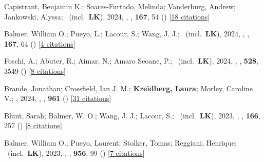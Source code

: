 \item[{\color{numcolor}\scriptsize102}] Capistrant, Benjamin K.; Soares-Furtado, Melinda; Vanderburg, Andrew; Jankowski, Alyssa; \etal\ (incl.\ \textbf{LK}), 2024, , \aj, \textbf{167}, 54 () [\href{https://ui.adsabs.harvard.edu/abs/2024AJ....167...54C}{18 citations}]

\item[{\color{numcolor}\scriptsize101}] Balmer, William O.; Pueyo, L.; Lacour, S.; Wang, J. J.; \etal\ (incl.\ \textbf{LK}), 2024, , \aj, \textbf{167}, 64 () [\href{https://ui.adsabs.harvard.edu/abs/2024AJ....167...64B}{4 citations}]

\item[{\color{numcolor}\scriptsize100}] Foschi, A.; Abuter, R.; Aimar, N.; Amaro Seoane, P.; \etal\ (incl.\ \textbf{LK}), 2024, , \mnras, \textbf{528}, 3549 () [\href{https://ui.adsabs.harvard.edu/abs/2024MNRAS.528.3549F}{8 citations}]

\item[{\color{numcolor}\scriptsize99}] Brande, Jonathan; Crossfield, Ian J. M.; \textbf{Kreidberg, Laura}; Morley, Caroline V.; \etal, 2024, , \apj, \textbf{961} () [\href{https://ui.adsabs.harvard.edu/abs/2024ApJ...961L..23B}{31 citations}]

\item[{\color{numcolor}\scriptsize98}] Blunt, Sarah; Balmer, W. O.; Wang, J. J.; Lacour, S.; \etal\ (incl.\ \textbf{LK}), 2023, , \aj, \textbf{166}, 257 () [\href{https://ui.adsabs.harvard.edu/abs/2023AJ....166..257B}{8 citations}]

\item[{\color{numcolor}\scriptsize97}] Balmer, William O.; Pueyo, Laurent; Stolker, Tomas; Reggiani, Henrique; \etal\ (incl.\ \textbf{LK}), 2023, , \apj, \textbf{956}, 99 () [\href{https://ui.adsabs.harvard.edu/abs/2023ApJ...956...99B}{7 citations}]

